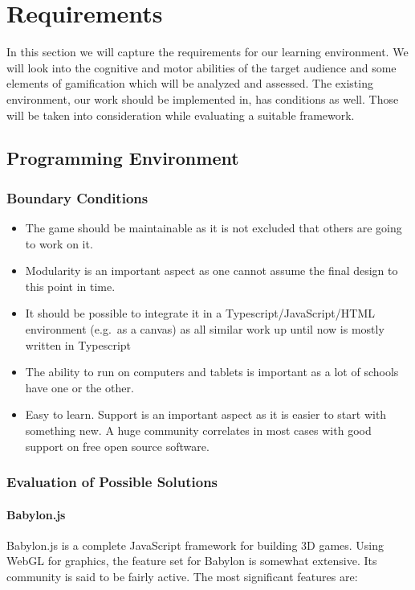 
\chapter{Requirements}\label{ch:requirements}
In this section we will capture the requirements for our learning environment.
We will look into the cognitive and motor abilities of the target audience and
some elements of gamification which will be analyzed and assessed.
The existing environment, our work should be implemented in, has conditions as well.
Those will be taken into consideration while evaluating a suitable framework.

\section{Programming Environment}
\subsection{Boundary Conditions}
\begin{itemize}
    \item The game should be maintainable as it is not excluded that others are going to work on it.
    \item Modularity is an important aspect as one cannot assume the final design to this point in time.
    \item It should be possible to integrate it in a Typescript/JavaScript/HTML environment (e.g.\ as a canvas) as
    all similar work up until now is mostly written in Typescript
    \item The ability to run on computers and tablets is important as a lot of schools have one or the other.
    \item Easy to learn. Support is an important aspect as it is easier to start with something new.
    A huge community correlates in most cases with good support on free open source software.
\end{itemize}

\subsection{Evaluation of Possible Solutions}
\subsubsection{Babylon.js}
Babylon.js is a complete JavaScript framework for building 3D games.
Using WebGL for graphics, the feature set for Babylon is somewhat extensive.
Its community is said to be fairly active.
The most significant features are:

